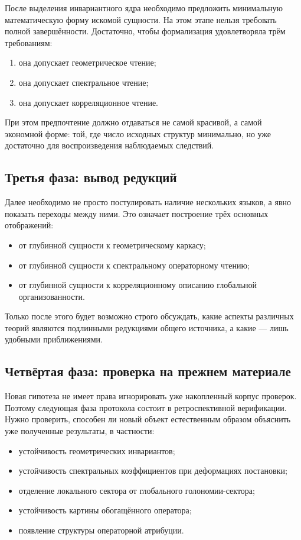 \documentclass[12pt,a4paper]{article}
\begin{document}
После выделения инвариантного ядра необходимо предложить минимальную математическую форму искомой сущности. На этом этапе нельзя требовать полной завершённости. Достаточно, чтобы формализация удовлетворяла трём требованиям:
\begin{enumerate}
    \item она допускает геометрическое чтение;
    \item она допускает спектральное чтение;
    \item она допускает корреляционное чтение.
\end{enumerate}

При этом предпочтение должно отдаваться не самой красивой, а самой экономной форме: той, где число исходных структур минимально, но уже достаточно для воспроизведения наблюдаемых следствий.

\subsection{Третья фаза: вывод редукций}

Далее необходимо не просто постулировать наличие нескольких языков, а явно показать переходы между ними. Это означает построение трёх основных отображений:
\begin{itemize}
    \item от глубинной сущности к геометрическому каркасу;
    \item от глубинной сущности к спектральному операторному чтению;
    \item от глубинной сущности к корреляционному описанию глобальной организованности.
\end{itemize}

Только после этого будет возможно строго обсуждать, какие аспекты различных теорий являются подлинными редукциями общего источника, а какие --- лишь удобными приближениями.

\subsection{Четвёртая фаза: проверка на прежнем материале}

Новая гипотеза не имеет права игнорировать уже накопленный корпус проверок. Поэтому следующая фаза протокола состоит в ретроспективной верификации. Нужно проверить, способен ли новый объект естественным образом объяснить уже полученные результаты, в частности:
\begin{itemize}
    \item устойчивость геометрических инвариантов;
    \item устойчивость спектральных коэффициентов при деформациях постановки;
    \item отделение локального сектора от глобального голономии-сектора;
    \item устойчивость картины обогащённого оператора;
    \item появление структуры операторной атрибуции.
\end{itemize}
\end{document}
